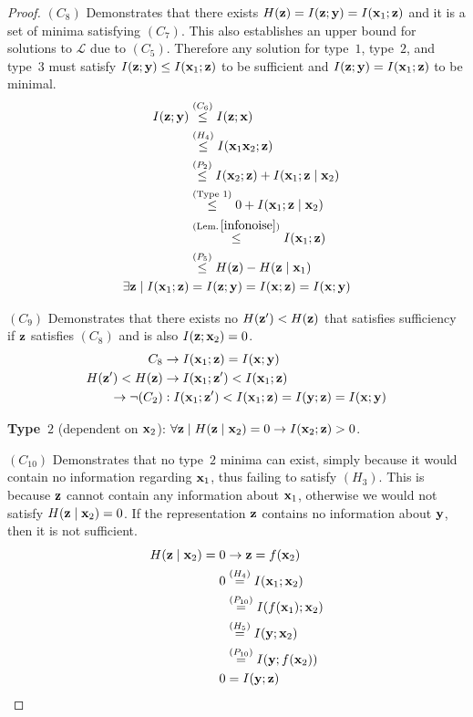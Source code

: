 \begin{proof}
$(C_8)$ Demonstrates that there exists $H({\mathbf{z}}) = I({\mathbf{z}}; {\mathbf{y}}) = I({\mathbf{x}}_1; {\mathbf{z}})$ and it is a set of minima satisfying $(C_7)$. This also establishes an upper bound for solutions to $\mathcal{L}$ due to $(C_5)$. Therefore any solution for type~$1$, type~$2$, and type~$3$ must satisfy $I({\mathbf{z}}; {\mathbf{y}}) \leq I({\mathbf{x}}_1; {\mathbf{z}})$ to be sufficient and $I({\mathbf{z}}; {\mathbf{y}}) = I({\mathbf{x}}_1; {\mathbf{z}})$ to be minimal.
\begin{align*} I({\mathbf{z}}; {\mathbf{y}}) &\stackrel{\left(C_6\right)}{\leq} I({\mathbf{z}}; {\mathbf{x}}) \\ &\stackrel{\left(H_4\right)}{\leq} I({\mathbf{x}}_1 {\mathbf{x}}_2; {\mathbf{z}}) \\ &\stackrel{\left(P_2\right)}{\leq} I({\mathbf{x}}_2; {\mathbf{z}}) + I({\mathbf{x}}_1; {\mathbf{z}} \mid {\mathbf{x}}_2) \\ &\stackrel{(\text{Type 1})}{\leq} 0 + I({\mathbf{x}}_1; {\mathbf{z}} \mid {\mathbf{x}}_2) \\ &\stackrel{(\text{Lem.}\,\ref{infonoise})}{\leq} I({\mathbf{x}}_1; {\mathbf{z}}) \\ &\stackrel{\left(P_5\right)}{\leq} H({\mathbf{z}}) - H({\mathbf{z}} \mid {\mathbf{x}}_1) \\ \exists {\mathbf{z}} \mid I({\mathbf{x}}_1; {\mathbf{z}}) &= I({\mathbf{z}}; {\mathbf{y}}) = I({\mathbf{x}}; {\mathbf{z}}) = I({\mathbf{x}}; {\mathbf{y}}) \end{align*}

$(C_9)$ Demonstrates that there exists no $H({\mathbf{z}}') < H({\mathbf{z}})$ that satisfies sufficiency if ${\mathbf{z}}$ satisfies $(C_8)$ and is also $I({\mathbf{z}}; {\mathbf{x}}_2) = 0$.
\begin{align*} C_8 &\rightarrow I({\mathbf{x}}_1; {\mathbf{z}}) = I({\mathbf{x}}; {\mathbf{y}}) \\ H({\mathbf{z}}') < H({\mathbf{z}}) &\rightarrow I({\mathbf{x}}_1; {\mathbf{z}}') < I({\mathbf{x}}_1; {\mathbf{z}}) \\ \rightarrow \neg (C_2)&: I({\mathbf{x}}_1; {\mathbf{z}}') < I({\mathbf{x}}_1; {\mathbf{z}}) = I({\mathbf{y}}; {\mathbf{z}}) = I({\mathbf{x}}; {\mathbf{y}}) \end{align*}

\textbf{Type~$2$} (dependent on ${\mathbf{x}}_2$): $\forall {\mathbf{z}} \mid H({\mathbf{z}} \mid {\mathbf{x}}_2)=0 \rightarrow I({\mathbf{x}}_2; {\mathbf{z}}) > 0$.

$(C_{10})$ Demonstrates that no type~$2$ minima can exist, simply because it would contain no information regarding ${\mathbf{x}}_1$, thus failing to satisfy $(H_3)$. This is because ${\mathbf{z}}$ cannot contain any information about ${\mathbf{x}}_1$, otherwise we would not satisfy $H({\mathbf{z}} \mid {\mathbf{x}}_2)=0$. If the representation ${\mathbf{z}}$ contains no information about ${\mathbf{y}}$, then it is not sufficient.
\begin{align*} H({\mathbf{z}} \mid {\mathbf{x}}_2) = 0 &\rightarrow {\mathbf{z}} = f({\mathbf{x}}_2) \\ 0 &\stackrel{\left(H_4\right)}{=} I({\mathbf{x}}_1; {\mathbf{x}}_2) \\ &\stackrel{\left(P_{10}\right)}{=} I(f({\mathbf{x}}_1);{\mathbf{x}}_2) \\ &\stackrel{\left(H_5\right)}{=} I({\mathbf{y}}; {\mathbf{x}}_2) \\ &\stackrel{\left(P_{10}\right)}{=} I({\mathbf{y}};f({\mathbf{x}}_2)) \\ 0 &= I({\mathbf{y}};{\mathbf{z}}) \end{align*}


\end{proof}
